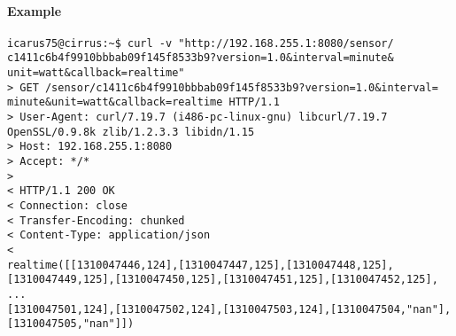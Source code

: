 \paragraph{Example}
\begin{Verbatim}
icarus75@cirrus:~$ curl -v "http://192.168.255.1:8080/sensor/
c1411c6b4f9910bbbab09f145f8533b9?version=1.0&interval=minute&
unit=watt&callback=realtime"
> GET /sensor/c1411c6b4f9910bbbab09f145f8533b9?version=1.0&interval=
minute&unit=watt&callback=realtime HTTP/1.1
> User-Agent: curl/7.19.7 (i486-pc-linux-gnu) libcurl/7.19.7
OpenSSL/0.9.8k zlib/1.2.3.3 libidn/1.15
> Host: 192.168.255.1:8080
> Accept: */*
> 
< HTTP/1.1 200 OK
< Connection: close
< Transfer-Encoding: chunked
< Content-Type: application/json
< 
realtime([[1310047446,124],[1310047447,125],[1310047448,125],
[1310047449,125],[1310047450,125],[1310047451,125],[1310047452,125], ...
[1310047501,124],[1310047502,124],[1310047503,124],[1310047504,"nan"],
[1310047505,"nan"]])
\end{Verbatim}
